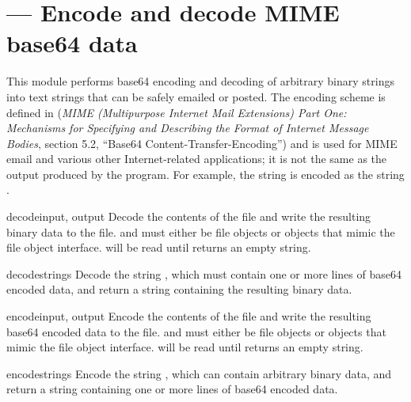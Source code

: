 \section{ ---
         Encode and decode MIME base64 data}




This module performs base64 encoding and decoding of arbitrary binary
strings into text strings that can be safely emailed or posted.  The
encoding scheme is defined in  (\emph{MIME
(Multipurpose Internet Mail Extensions) Part One: Mechanisms for
Specifying and Describing the Format of Internet Message Bodies},
section 5.2, ``Base64 Content-Transfer-Encoding'') and is used for
MIME email and various other Internet-related applications; it is not
the same as the output produced by the  program.
For example, the string  is encoded as the
string .  


\begin{funcdesc}{decode}{input, output}
Decode the contents of the  file and write the resulting
binary data to the  file.
 and  must either be file objects or objects that
mimic the file object interface.  will be read until
 returns an empty string.
\end{funcdesc}

\begin{funcdesc}{decodestring}{s}
Decode the string , which must contain one or more lines of
base64 encoded data, and return a string containing the resulting
binary data.
\end{funcdesc}

\begin{funcdesc}{encode}{input, output}
Encode the contents of the  file and write the resulting
base64 encoded data to the  file.
 and  must either be file objects or objects that
mimic the file object interface.  will be read until
 returns an empty string.
\end{funcdesc}

\begin{funcdesc}{encodestring}{s}
Encode the string , which can contain arbitrary binary data,
and return a string containing one or more lines of
base64 encoded data.
\end{funcdesc}


\begin{seealso}
\end{seealso}
